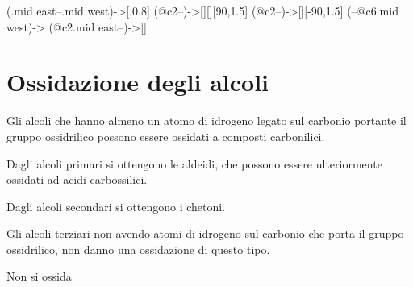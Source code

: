 \begin{reaction}
	 \+ 
	\arrow(.mid east--.mid west){->}[,0.8]
	 \+ 
	\arrow(@c2--){->[][]}[90,1.5]
	 \+ 
	\arrow{->}
	\arrow(@c2--){->[]}[-90,1.5]
	 \+ 
	\arrow(--@c6.mid west){->}
	\arrow(@c2.mid east--){->[\mech[2]]}
\end{reaction}


\section{Ossidazione degli alcoli}
Gli alcoli che hanno almeno un atomo di idrogeno legato sul carbonio portante il gruppo ossidrilico possono essere ossidati a composti carbonilici.

Dagli alcoli primari si ottengono le aldeidi, che possono essere ulteriormente ossidati ad acidi carbossilici.
\begin{reaction}
	\arrow{->[[O]]}
	\arrow{->[[O]]}
\end{reaction}
Dagli alcoli secondari si ottengono i chetoni.
\begin{reaction}
	\arrow{->[[O]]}
\end{reaction}
Gli alcoli terziari non avendo atomi di idrogeno sul carbonio che porta il gruppo ossidrilico, non danno una ossidazione di questo tipo.
\begin{reaction}
	\arrow{->[[O]]}
	Non si ossida
\end{reaction}

